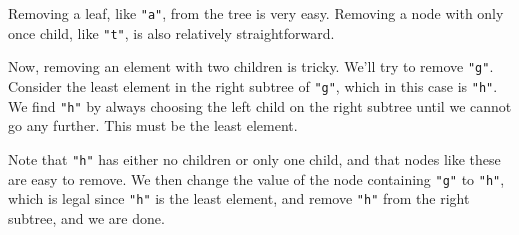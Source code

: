 \documentclass[11pt]{book}
\begin{document}
Removing a leaf, like \texttt{"a"}, from the tree is very easy. Removing a node with only once child, like \texttt{"t"}, is also relatively straightforward.

\begin{center}
\end{center}

Now, removing an element with two children is tricky. We'll try to remove \texttt{"g"}. Consider the least element in the right subtree of \texttt{"g"}, which in this case is \texttt{"h"}. We find \texttt{"h"} by always choosing the left child on the right subtree until we cannot go any further. This must be the least element.

Note that \texttt{"h"} has either no children or only one child, and that nodes like these are easy to remove. We then change the value of the node containing \texttt{"g"} to \texttt{"h"}, which is legal since \texttt{"h"} is the least element, and remove \texttt{"h"} from the right subtree, and we are done.

\begin{center}
\end{center}
\end{document}
